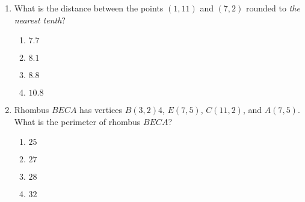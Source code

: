 \begin{enumerate}
\item What is the distance between the points $(1,11)$ and $(7,2)$ rounded to \emph{the nearest tenth}?
  \begin{multicols}{2}
    \begin{enumerate}
      \item $7.7$
      \item $8.1$ 
      \item $8.8$
      \item $10.8$
    \end{enumerate}
  \end{multicols} \vspace{1cm}

\item Rhombus $BECA$ has vertices $B(3,2)$4, $E(7,5)$, $C(11,2)$, and $A(7,5)$. What is the perimeter of rhombus $BECA$?
  \begin{multicols}{2}
    \begin{enumerate}
      \item $25$
      \item $27$ 
      \item $28$
      \item $32$
    \end{enumerate}
  \end{multicols}


\end{enumerate}
